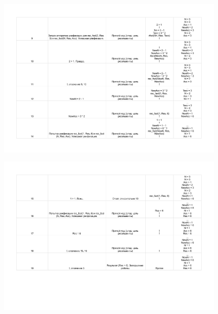 \documentclass[12pt]{report}
\begin{document}
\begin{figure}[H]
	\begin{center}
		\includegraphics[scale=0.7]{imgs/table_16_01-2.pdf}
	\end{center}
\end{figure}

\begin{figure}[H]
	\begin{center}
		\includegraphics[scale=0.7]{imgs/table_16_01-3.pdf}
	\end{center}
\end{figure}
\end{document}
